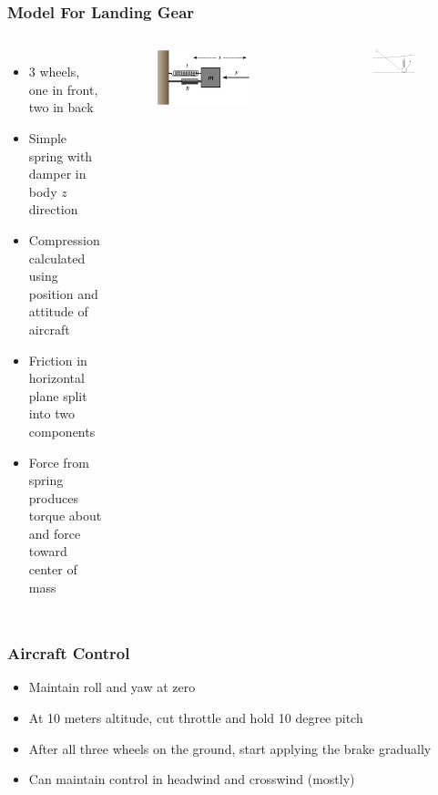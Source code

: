 \documentclass[10pt]{beamer}
\begin{document}
\begin{frame}
  \frametitle{Model For Landing Gear}
  \begin{columns}[c]

    \begin{itemize}
    \item 3 wheels, one in front, two in back
    \item Simple spring with damper in body $z$ direction
    \item Compression calculated using position and attitude of aircraft
    \item Friction in horizontal plane split into two components
    \item Force from spring produces torque about and force toward center of mass
    \end{itemize}

    \begin{figure}[h]
      \includegraphics[width=0.75\textwidth]{img/Mass-Spring-Damper.png}
    \end{figure}
    \begin{figure}[h]
      \includegraphics[width=0.75\textwidth]{img/landDiag.png}
    \end{figure}
  \end{columns}
\end{frame}


\begin{frame}
  \large
  \frametitle{Aircraft Control}
  \begin{itemize}
  \item Maintain roll and yaw at zero
  \item At 10 meters altitude, cut throttle and hold 10 degree pitch
  \item After all three wheels on the ground, start applying the brake gradually
  \item Can maintain control in headwind and crosswind (mostly)
  \end{itemize}
\end{frame}
\end{document}
